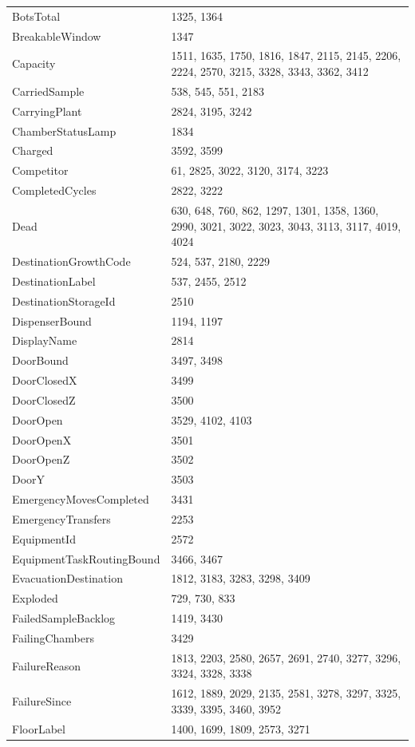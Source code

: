 \begin{longtable}{p{}p{}}
BotsTotal & 1325, 1364 \\
BreakableWindow & 1347 \\
Capacity & 1511, 1635, 1750, 1816, 1847, 2115, 2145, 2206, 2224, 2570, 3215, 3328, 3343, 3362, 3412 \\
CarriedSample & 538, 545, 551, 2183 \\
CarryingPlant & 2824, 3195, 3242 \\
ChamberStatusLamp & 1834 \\
Charged & 3592, 3599 \\
Competitor & 61, 2825, 3022, 3120, 3174, 3223 \\
CompletedCycles & 2822, 3222 \\
Dead & 630, 648, 760, 862, 1297, 1301, 1358, 1360, 2990, 3021, 3022, 3023, 3043, 3113, 3117, 4019, 4024 \\
DestinationGrowthCode & 524, 537, 2180, 2229 \\
DestinationLabel & 537, 2455, 2512 \\
DestinationStorageId & 2510 \\
DispenserBound & 1194, 1197 \\
DisplayName & 2814 \\
DoorBound & 3497, 3498 \\
DoorClosedX & 3499 \\
DoorClosedZ & 3500 \\
DoorOpen & 3529, 4102, 4103 \\
DoorOpenX & 3501 \\
DoorOpenZ & 3502 \\
DoorY & 3503 \\
EmergencyMovesCompleted & 3431 \\
EmergencyTransfers & 2253 \\
EquipmentId & 2572 \\
EquipmentTaskRoutingBound & 3466, 3467 \\
EvacuationDestination & 1812, 3183, 3283, 3298, 3409 \\
Exploded & 729, 730, 833 \\
FailedSampleBacklog & 1419, 3430 \\
FailingChambers & 3429 \\
FailureReason & 1813, 2203, 2580, 2657, 2691, 2740, 3277, 3296, 3324, 3328, 3338 \\
FailureSince & 1612, 1889, 2029, 2135, 2581, 3278, 3297, 3325, 3339, 3395, 3460, 3952 \\
FloorLabel & 1400, 1699, 1809, 2573, 3271 \\

\end{longtable}
